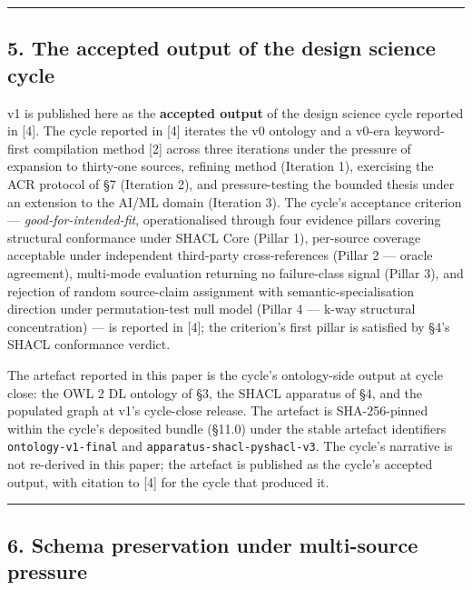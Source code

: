\documentclass[
]{article}
\begin{document}
\begin{center}\rule{0.5\linewidth}{0.5pt}\end{center}

\subsection{5. The accepted output of the design science
cycle}\label{the-accepted-output-of-the-design-science-cycle}

v1 is published here as the \textbf{accepted output} of the design
science cycle reported in {[}4{]}. The cycle reported in {[}4{]}
iterates the v0 ontology and a v0-era keyword-first compilation method
{[}2{]} across three iterations under the pressure of expansion to
thirty-one sources, refining method (Iteration 1), exercising the ACR
protocol of §7 (Iteration 2), and pressure-testing the bounded thesis
under an extension to the AI/ML domain (Iteration 3). The cycle's
acceptance criterion --- \emph{good-for-intended-fit}, operationalised
through four evidence pillars covering structural conformance under
SHACL Core (Pillar 1), per-source coverage acceptable under independent
third-party cross-references (Pillar 2 --- oracle agreement), multi-mode
evaluation returning no failure-class signal (Pillar 3), and rejection
of random source-claim assignment with semantic-specialisation direction
under permutation-test null model (Pillar 4 --- k-way structural
concentration) --- is reported in {[}4{]}; the criterion's first pillar
is satisfied by §4's SHACL conformance verdict.

The artefact reported in this paper is the cycle's ontology-side output
at cycle close: the OWL 2 DL ontology of §3, the SHACL apparatus of §4,
and the populated graph at v1's cycle-close release. The artefact is
SHA-256-pinned within the cycle's deposited bundle (§11.0) under the
stable artefact identifiers \texttt{ontology-v1-final} and
\texttt{apparatus-shacl-pyshacl-v3}. The cycle's narrative is not
re-derived in this paper; the artefact is published as the cycle's
accepted output, with citation to {[}4{]} for the cycle that produced
it.

\begin{center}\rule{0.5\linewidth}{0.5pt}\end{center}

\subsection{6. Schema preservation under multi-source
pressure}\label{schema-preservation-under-multi-source-pressure}
\end{document}
